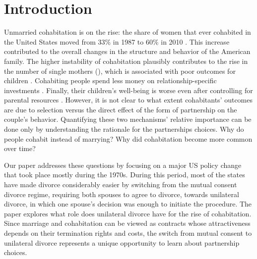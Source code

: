 \documentclass[12pt]{article}
\numberwithin{table}{section}
\begin{document}
\clearpage
\section{Introduction}



Unmarried cohabitation is on the rise: the share of women that ever cohabited in the United States moved from 33\% in 1987 to 60\% in 2010 \citep{manning2013}. This increase contributed to the overall changes in the structure and behavior of the American family. The higher instability of cohabitation plausibly contributes to the rise in the number of single mothers (\cite{bumpass2000}), which is associated with poor outcomes for children \citep{chetty2018,mclanahan2013}. Cohabiting people spend less money on relationship-specific investments %
\citep{poortman2012}. Finally, their children's well-being is worse even after controlling for parental resources \citep{brown2004}. However, it is not clear to what extent cohabitants' outcomes are due to selection %
versus the direct effect of the form of partnership on the couple's behavior. Quantifying these two mechanisms' relative importance can be done only by understanding the rationale for the partnerships choices. Why do people cohabit instead of marrying? Why did cohabitation become more common over time?

Our paper addresses these questions by focusing on a major US policy change that took place mostly during the 1970s. During this period, most of the states have made divorce considerably easier by switching from the mutual consent divorce regime, requiring both spouses to agree to divorce, towards unilateral divorce, in which one spouse's decision was enough to initiate the procedure. The paper explores what role does unilateral divorce have for the rise of cohabitation. Since marriage and cohabitation can be viewed as contracts whose attractiveness depends on their termination rights and costs, the switch from mutual consent to unilateral divorce represents a unique opportunity to learn about partnership choices.
\end{document}
